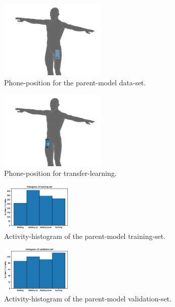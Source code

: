 \documentclass[journal]{IEEEtran}
\begin{document}
\begin{figure}[htbp]
    \centering
    \includegraphics[width=0.45\textwidth]{figures/original_model_position.png}
    \caption{Phone-position for the parent-model data-set.}
    \label{fig:tfl_base}
\end{figure}

\begin{figure}[htbp]
    \centering
    \includegraphics[width=0.45\textwidth]{figures/transfer_learning_position.png}
    \caption{Phone-position for transfer-learning.}
    \label{fig:tfl_tfl}
\end{figure}

\begin{figure}[htbp]
    \centering
    \includegraphics[width=0.3\textwidth]{figures/hist_parent_training.eps}
    \caption{Activity-histogram of the parent-model training-set.}
    \label{fig:hist_parent_training}
\end{figure}

\begin{figure}[htbp]
    \centering
    \includegraphics[width=0.3\textwidth]{figures/hist_parent_validation.eps}
    \caption{Activity-histogram of the parent-model validation-set.}
    \label{fig:hist_parent_validation}
\end{figure}
\end{document}
